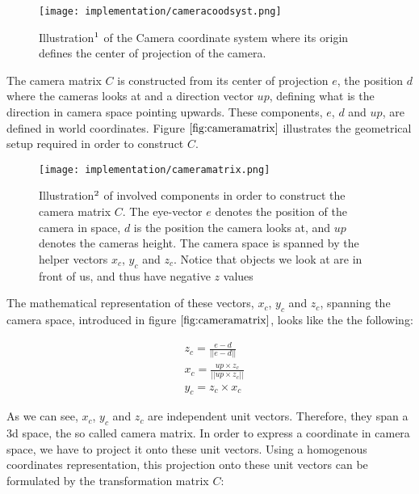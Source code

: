 \begin{figure}[H]
  \centering
  \texttt{[image: implementation/cameracoodsyst.png]}
  \caption[Camera Coordinate System]{Illustration$\footnotemark$ of the Camera coordinate system where its origin defines the center of projection of the camera.}
  \label{fig:cameracoordinatesystem}
\end{figure}

The camera matrix $C$ is constructed from its center of projection $e$, the position $d$ where the cameras looks at and a direction vector $up$, defining what is the direction in camera space pointing upwards. These components, $e$, $d$ and $up$, are defined in world coordinates. Figure $\ref{fig:cameramatrix}$ illustrates the geometrical setup required in order to construct $C$.

\begin{figure}[H]
  \centering
  \texttt{[image: implementation/cameramatrix.png]}
  \caption[Camera Matrix]{Illustration$\footnotemark$ of involved components in order to construct the camera matrix $C$. The eye-vector $e$ denotes the position of the camera in space, $d$ is the position the camera looks at, and $up$ denotes the cameras height. The camera space is spanned by the helper vectors $x_c$, $y_c$ and $z_c$. Notice that objects we look at are in front of us, and thus have negative $z$ values}
  \label{fig:cameramatrix}
\end{figure}

The mathematical representation of these vectors, $x_c$, $y_c$ and $z_c$, spanning the camera space, introduced in figure $\ref{fig:cameramatrix}$, looks like the the following: 

\begin{align}
  &z_c = \frac{e-d}{||e-d||} \nonumber \\
  &x_c = \frac{up \times z_c}{||up \times z_c||} \nonumber \\
  &y_c = z_c \times x_c
  \label{eq:cameraspacespanningvectors}
\end{align}

As we can see, $x_c$, $y_c$ and $z_c$ are independent unit vectors. Therefore, they span a 3d space, the so called camera matrix. In order to express a coordinate in camera space, we have to project it onto these unit vectors. Using a homogenous coordinates representation, this projection onto these unit vectors can be formulated by the transformation matrix $C$:


